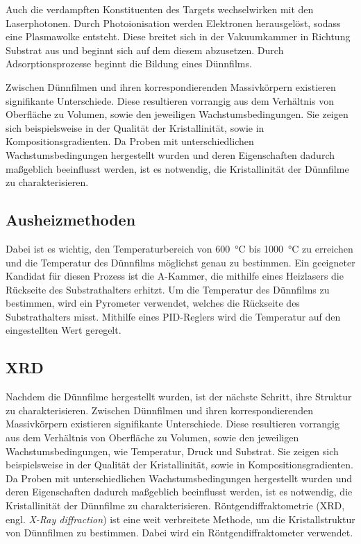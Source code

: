 Auch die verdampften Konstituenten des Targets wechselwirken mit den Laserphotonen.
Durch Photoionisation werden Elektronen herausgelöst, sodass eine Plasmawolke entsteht.
Diese breitet sich in der Vakuumkammer in Richtung Substrat aus und beginnt sich auf dem diesem abzusetzen.
Durch Adsorptionsprozesse beginnt die Bildung eines Dünnfilms.\autocite[2299-2301]{pld}

Zwischen Dünnfilmen und ihren korrespondierenden Massivkörpern existieren signifikante Unterschiede.
Diese resultieren vorrangig aus dem Verhältnis von Oberfläche zu Volumen, sowie den jeweiligen
Wachstumsbedingungen.
Sie zeigen sich beispielsweise in der Qualität der Kristallinität, sowie in Kompositionsgradienten.
Da Proben mit unterschiedlichen Wachstumsbedingungen hergestellt wurden und deren Eigenschaften dadurch
maßgeblich beeinflusst werden, ist es notwendig, die Kristallinität der Dünnfilme zu charakterisieren.

\subsection{Ausheizmethoden}\label{subsec:ausheiz}

Dabei ist es wichtig, den Temperaturbereich von \qty{600}{\degreeCelsius} bis \qty{1000}{\degreeCelsius} zu erreichen
und die Temperatur des Dünnfilms möglichst genau zu bestimmen.
Ein geeigneter Kandidat für diesen Prozess ist die A-Kammer, die mithilfe eines Heizlasers die Rückseite des
Substrathalters erhitzt.
Um die Temperatur des Dünnfilms zu bestimmen, wird ein Pyrometer verwendet, welches die Rückseite des Substrathalters
misst.
Mithilfe eines PID-Reglers wird die Temperatur auf den eingestellten Wert geregelt.

\newpage

\subsection{XRD}\label{subsec:xrd}
Nachdem die Dünnfilme hergestellt wurden, ist der nächste Schritt, ihre Struktur zu charakterisieren.
Zwischen Dünnfilmen und ihren korrespondierenden Massivkörpern existieren signifikante Unterschiede.
Diese resultieren vorrangig aus dem Verhältnis von Oberfläche zu Volumen, sowie den jeweiligen
Wachstumsbedingungen, wie Temperatur, Druck und Substrat.
Sie zeigen sich beispielsweise in der Qualität der Kristallinität, sowie in Kompositionsgradienten.
Da Proben mit unterschiedlichen Wachstumsbedingungen hergestellt wurden und deren Eigenschaften dadurch
maßgeblich beeinflusst werden, ist es notwendig, die Kristallinität der Dünnfilme zu charakterisieren.
Röntgendiffraktometrie (XRD, engl. \textit{X-Ray diffraction}) ist eine weit verbreitete Methode, um die
Kristallstruktur von Dünnfilmen zu bestimmen.
Dabei wird ein Röntgendiffraktometer verwendet.

